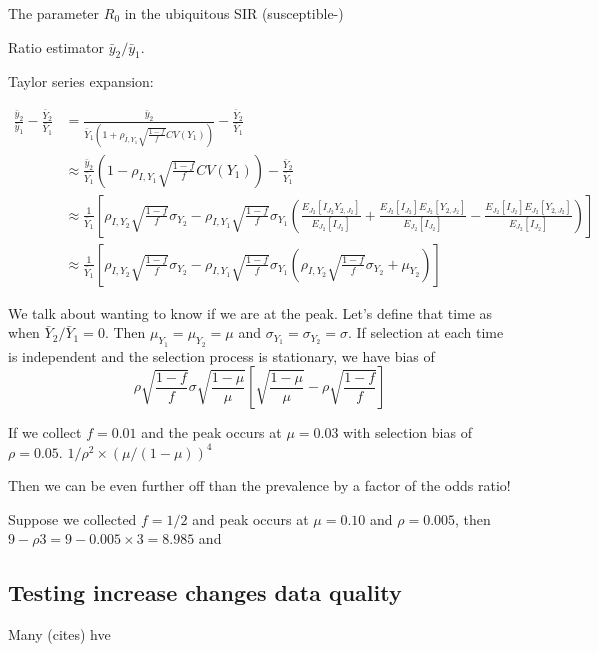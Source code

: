 \documentclass[12pt]{article}
\numberwithin{equation}{section}
\theoremstyle{plain}
\begin{document}
The parameter $R_0$ in the ubiquitous SIR (susceptible-)

Ratio estimator $\bar y_2/ \bar y_1$.

Taylor series expansion:

$$
\begin{aligned}
\frac{\bar y_2}{\bar y_1} - \frac{\bar Y_2}{\bar Y_1}
&= \frac{\bar y_2}{\bar Y_1  \left(1 + \rho_{I,Y_1} \sqrt{\frac{1-f}{f}} CV (Y_1) \right) } - \frac{\bar Y_2}{\bar Y_1}  \\
&\approx \frac{\bar y_2}{\bar Y_1} \left(1 - \rho_{I,Y_1} \sqrt{\frac{1-f}{f}} CV (Y_1) \right) - \frac{\bar Y_2}{\bar Y_1} \\
&\approx \frac{1}{\bar Y_1} \left[ \rho_{I, Y_2} \sqrt{\frac{1-f}{f}} \sigma_{Y_2} - \rho_{I, Y_1} \sqrt{\frac{1-f}{f}} \sigma_{Y_1}
\left( \frac{E_{J_2} [ I_{J_2} Y_{2,J_2} ]}{E_{J_2} [ I_{J_2} ]} + \frac{E_{J_2} [ I_{J_2} ] E_{J_2} [ Y_{2,J_2} ]}{E_{J_2} [ I_{J_2} ]} - \frac{E_{J_2} [ I_{J_2} ] E_{J_2} [ Y_{2,J_2} ]}{E_{J_2} [ I_{J_2} ]} \right) \right] \\
&\approx \frac{1}{\bar Y_1} \left[ \rho_{I, Y_2} \sqrt{\frac{1-f}{f}} \sigma_{Y_2} - \rho_{I, Y_1} \sqrt{\frac{1-f}{f}} \sigma_{Y_1}
\left( \rho_{I, Y_2} \sqrt{\frac{1-f}{f}} \sigma_{Y_2} + \mu_{Y_2} \right) \right]
\end{aligned}
$$

We talk about wanting to know if we are at the peak.  Let's define that time as when $\bar Y_2 / \bar Y_1 = 0$.  Then $\mu_{Y_1} = \mu_{Y_2} = \mu$ and $\sigma_{Y_1} = \sigma_{Y_2} = \sigma$. If selection at each time is independent and the selection process is stationary, we have bias of
$$
\rho \sqrt{\frac{1-f}{f}} \sigma \sqrt{\frac{1-\mu}{\mu}} \left[ \sqrt{\frac{1-\mu}{\mu}} - \rho \sqrt{\frac{1-f}{f}} \right ]
$$

If we collect $f = 0.01$ and the peak occurs at $\mu = 0.03$ with selection bias of $\rho = 0.05$. $1/\rho^2 \times (\mu/(1-\mu))^4$

Then we can be even further off than the prevalence by a factor of the odds ratio!

Suppose we collected $f=1/2$ and peak occurs at $\mu = 0.10$ and $\rho = 0.005$, then $9-\rho 3 = 9 - 0.005 \times 3 = 8.985$ and

\subsection{Testing increase changes data quality}

Many (cites) hve
\end{document}
